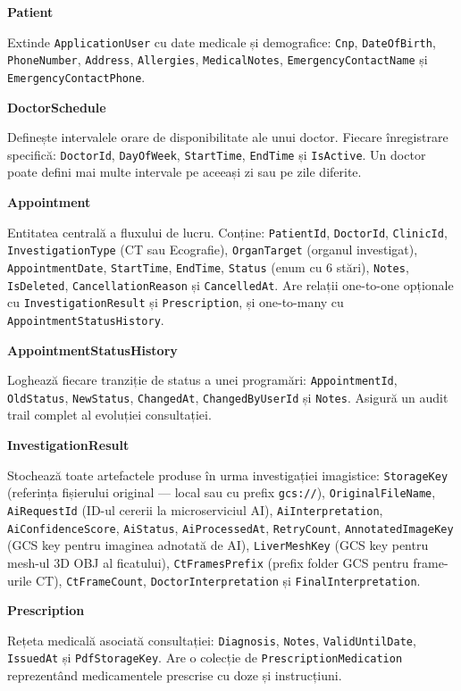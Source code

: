 \documentclass[12pt, a4paper]{report}
\begin{document}
\textbf{Patient}

Extinde \texttt{ApplicationUser} cu date medicale și demografice: \texttt{Cnp},
\texttt{DateOfBirth}, \texttt{PhoneNumber}, \texttt{Address}, \texttt{Allergies},
\texttt{MedicalNotes}, \texttt{EmergencyContactName} și \texttt{EmergencyContactPhone}.

\textbf{DoctorSchedule}

Definește intervalele orare de disponibilitate ale unui doctor. Fiecare înregistrare
specifică: \texttt{DoctorId}, \texttt{DayOfWeek}, \texttt{StartTime}, \texttt{EndTime}
și \texttt{IsActive}. Un doctor poate defini mai multe intervale pe aceeași zi sau pe
zile diferite.

\textbf{Appointment}

Entitatea centrală a fluxului de lucru. Conține: \texttt{PatientId}, \texttt{DoctorId},
\texttt{ClinicId}, \texttt{InvestigationType} (CT sau Ecografie), \texttt{OrganTarget}
(organul investigat), \texttt{AppointmentDate}, \texttt{StartTime}, \texttt{EndTime},
\texttt{Status} (enum cu 6 stări), \texttt{Notes}, \texttt{IsDeleted},
\texttt{CancellationReason} și \texttt{CancelledAt}. Are relații one-to-one opționale
cu \texttt{InvestigationResult} și \texttt{Prescription}, și one-to-many cu
\texttt{AppointmentStatusHistory}.

\textbf{AppointmentStatusHistory}

Loghează fiecare tranziție de status a unei programări: \texttt{AppointmentId},
\texttt{OldStatus}, \texttt{NewStatus}, \texttt{ChangedAt}, \texttt{ChangedByUserId}
și \texttt{Notes}. Asigură un audit trail complet al evoluției consultației.

\textbf{InvestigationResult}

Stochează toate artefactele produse în urma investigației imagistice: \texttt{StorageKey}
(referința fișierului original --- local sau cu prefix \texttt{gcs://}),
\texttt{OriginalFileName}, \texttt{AiRequestId} (ID-ul cererii la microserviciul AI),
\texttt{AiInterpretation}, \texttt{AiConfidenceScore}, \texttt{AiStatus},
\texttt{AiProcessedAt}, \texttt{RetryCount}, \texttt{AnnotatedImageKey} (GCS key pentru
imaginea adnotată de AI), \texttt{LiverMeshKey} (GCS key pentru mesh-ul 3D OBJ al
ficatului), \texttt{CtFramesPrefix} (prefix folder GCS pentru frame-urile CT),
\texttt{CtFrameCount}, \texttt{DoctorInterpretation} și \texttt{FinalInterpretation}.

\textbf{Prescription}

Rețeta medicală asociată consultației: \texttt{Diagnosis}, \texttt{Notes},
\texttt{ValidUntilDate}, \texttt{IssuedAt} și \texttt{PdfStorageKey}. Are o colecție de
\texttt{PrescriptionMedication} reprezentând medicamentele prescrise cu doze și
instrucțiuni.
\end{document}
